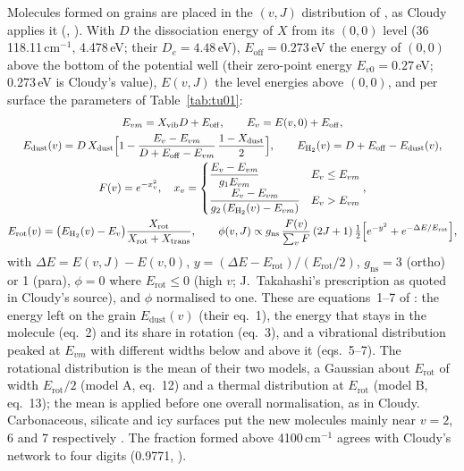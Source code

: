 Molecules formed on grains are placed in the $(v,J)$ distribution of
\citet{TakahashiUehara2001}, as Cloudy applies it \citep{Shaw2005}
(, ). With $D$ the dissociation
energy of $X$ from its $(0,0)$ level (36\,118.11\,cm$^{-1}$, 4.478\,eV; their
$D_e=4.48$\,eV), $E_{\mathrm{off}}=0.273$\,eV the energy of $(0,0)$ above the bottom of the
potential well (their zero-point energy $E_{v0}=0.27$\,eV; 0.273\,eV is Cloudy's
value), $E(v,J)$ the level energies above $(0,0)$, and per surface the
parameters of Table~\ref{tab:tu01}:
\begin{gather}
  E_{vm} = X_{\mathrm{vib}}D + E_{\mathrm{off}},\qquad
  E_v = E(v,0)+E_{\mathrm{off}},\\
  E_{\mathrm{dust}}(v) = D\,X_{\mathrm{dust}}\Bigl[1-\frac{E_v-E_{vm}}{D+E_{\mathrm{off}}-E_{vm}}\,\frac{1-X_{\mathrm{dust}}}{2}\Bigr],\qquad
  E_{\mathrm{H_2}}(v) = D+E_{\mathrm{off}}-E_{\mathrm{dust}}(v),\\
  F(v) = e^{-x_v^2},\quad
  x_v = \begin{cases}\dfrac{E_v-E_{vm}}{g_1E_{vm}} & E_v\le E_{vm}\\[6pt]
                     \dfrac{E_v-E_{vm}}{g_2\,(E_{\mathrm{H_2}}(v)-E_{vm})} & E_v>E_{vm}\end{cases},\\
  E_{\mathrm{rot}}(v) = \bigl(E_{\mathrm{H_2}}(v)-E_v\bigr)\frac{X_{\mathrm{rot}}}{X_{\mathrm{rot}}+X_{\mathrm{trans}}},\qquad
  \phi(v,J)\propto g_{\mathrm{ns}}\,\frac{F(v)}{\sum_vF}\,(2J+1)\,\tfrac12\Bigl[e^{-y^2}+e^{-\Delta E/E_{\mathrm{rot}}}\Bigr],
\end{gather}
with $\Delta E=E(v,J)-E(v,0)$, $y=(\Delta E-E_{\mathrm{rot}})/(E_{\mathrm{rot}}/2)$,
$g_{\mathrm{ns}}=3$ (ortho) or 1 (para), $\phi=0$ where $E_{\mathrm{rot}}\le0$ (high $v$;
J.~Takahashi's prescription as quoted in Cloudy's source), and $\phi$
normalised to one. These are equations~1--7 of \citet{TakahashiUehara2001}:
the energy left on the grain $E_{\mathrm{dust}}(v)$ (their eq.~1), the energy that
stays in the molecule (eq.~2) and its share in rotation (eq.~3), and a
vibrational distribution peaked at $E_{vm}$ with different widths below and
above it (eqs.~5--7). The rotational distribution is the mean of their two
models, a Gaussian about $E_{\mathrm{rot}}$ of width $E_{\mathrm{rot}}/2$ (model A,
eq.~12) and a thermal distribution at $E_{\mathrm{rot}}$ (model B, eq.~13); the mean
is applied before one overall normalisation, as in Cloudy. Carbonaceous,
silicate and icy surfaces put the new molecules mainly near $v=2$, 6 and 7
respectively \citep{Shaw2005}. The fraction formed above 4100\,cm$^{-1}$ agrees
with Cloudy's network to four digits (0.9771, ).

